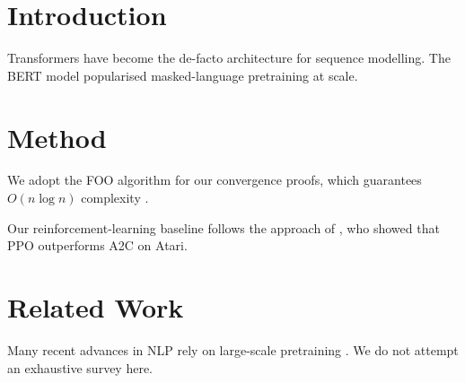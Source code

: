 \documentclass{article}
\begin{document}
\section{Introduction}
Transformers \cite{vaswani2017attention} have become the de-facto architecture
for sequence modelling. The BERT model \cite{devlin2019bert} popularised
masked-language pretraining at scale.

\section{Method}
We adopt the FOO algorithm \cite{xxx2024foo} for our convergence proofs,
which guarantees $O(n \log n)$ complexity \cite{vaswani2017attention}.

Our reinforcement-learning baseline follows the approach of
\cite{devlin2019bert}, who showed that PPO outperforms A2C on Atari.

\section{Related Work}
Many recent advances in NLP rely on large-scale pretraining
\cite{vaswani2017attention,devlin2019bert,radford2019language}. We do not
attempt an exhaustive survey here.



\end{document}
